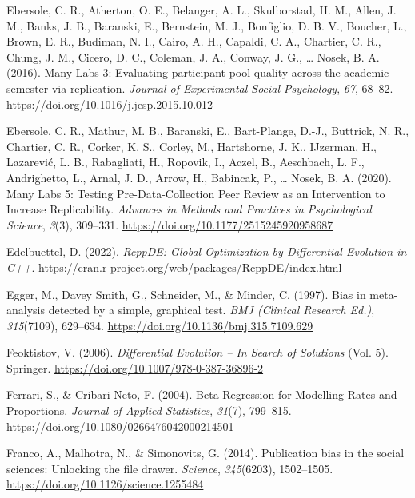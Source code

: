 \documentclass[
  12pt,
]{scrartcl}
\newlength{\cslhangindent}
\newenvironment{CSLReferences}[2] %
 {\begin{list}{}{%
  \setlength{\itemindent}{0pt}
  \setlength{\leftmargin}{0pt}
  \setlength{\parsep}{0pt}
  \ifodd #1
   \setlength{\leftmargin}{\cslhangindent}
   \setlength{\itemindent}{-1\cslhangindent}
  \fi
  \setlength{\itemsep}{#2\baselineskip}}}
 {\end{list}}
\begin{document}
\begin{CSLReferences}{1}{0}
Ebersole, C. R., Atherton, O. E., Belanger, A. L., Skulborstad, H. M.,
Allen, J. M., Banks, J. B., Baranski, E., Bernstein, M. J., Bonfiglio,
D. B. V., Boucher, L., Brown, E. R., Budiman, N. I., Cairo, A. H.,
Capaldi, C. A., Chartier, C. R., Chung, J. M., Cicero, D. C., Coleman,
J. A., Conway, J. G., \ldots{} Nosek, B. A. (2016). Many {Labs} 3:
{Evaluating} participant pool quality across the academic semester via
replication. \emph{Journal of Experimental Social Psychology},
\emph{67}, 68--82. \url{https://doi.org/10.1016/j.jesp.2015.10.012}

Ebersole, C. R., Mathur, M. B., Baranski, E., Bart-Plange, D.-J.,
Buttrick, N. R., Chartier, C. R., Corker, K. S., Corley, M., Hartshorne,
J. K., IJzerman, H., Lazarević, L. B., Rabagliati, H., Ropovik, I.,
Aczel, B., Aeschbach, L. F., Andrighetto, L., Arnal, J. D., Arrow, H.,
Babincak, P., \ldots{} Nosek, B. A. (2020). Many {Labs} 5: {Testing}
{Pre}-{Data}-{Collection} {Peer} {Review} as an {Intervention} to
{Increase} {Replicability}. \emph{Advances in Methods and Practices in
Psychological Science}, \emph{3}(3), 309--331.
\url{https://doi.org/10.1177/2515245920958687}

Edelbuettel, D. (2022). \emph{{RcppDE}: {Global} {Optimization} by
{Differential} {Evolution} in {C}++}.
\url{https://cran.r-project.org/web/packages/RcppDE/index.html}

Egger, M., Davey Smith, G., Schneider, M., \& Minder, C. (1997). Bias in
meta-analysis detected by a simple, graphical test. \emph{BMJ (Clinical
Research Ed.)}, \emph{315}(7109), 629--634.
\url{https://doi.org/10.1136/bmj.315.7109.629}

Feoktistov, V. (2006). \emph{Differential {Evolution} -- {In} {Search}
of {Solutions}} (Vol. 5). Springer.
\url{https://doi.org/10.1007/978-0-387-36896-2}

Ferrari, S., \& Cribari-Neto, F. (2004). Beta {Regression} for
{Modelling} {Rates} and {Proportions}. \emph{Journal of Applied
Statistics}, \emph{31}(7), 799--815.
\url{https://doi.org/10.1080/0266476042000214501}

Franco, A., Malhotra, N., \& Simonovits, G. (2014). Publication bias in
the social sciences: {Unlocking} the file drawer. \emph{Science},
\emph{345}(6203), 1502--1505.
\url{https://doi.org/10.1126/science.1255484}


\end{CSLReferences}
\end{document}
